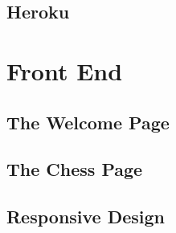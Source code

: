 \subsection{Heroku}




\section{Front End}


\subsection{The Welcome Page}



\subsection{The Chess Page}



\subsection{Responsive Design}

